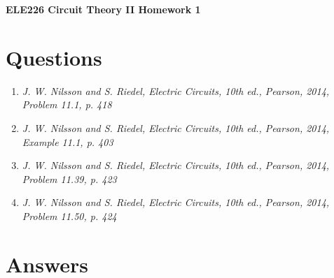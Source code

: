 \documentclass[11pt]{article}
\begin{document}
\begin{center}
\large
\textbf{ELE226 Circuit Theory II Homework 1}
\end{center}

\section{Questions}

\begin{enumerate}[leftmargin=*,label=\textbf{\arabic*.}]

\item \textit{J. W. Nilsson and S. Riedel, Electric Circuits, 10th ed., Pearson, 2014, Problem 11.1, p. 418}
\item \textit{J. W. Nilsson and S. Riedel, Electric Circuits, 10th ed., Pearson, 2014, Example 11.1, p. 403}
\item \textit{J. W. Nilsson and S. Riedel, Electric Circuits, 10th ed., Pearson, 2014, Problem 11.39, p. 423}
\item \textit{J. W. Nilsson and S. Riedel, Electric Circuits, 10th ed., Pearson, 2014, Problem 11.50, p. 424}

\end{enumerate}

\section{Answers}
\end{document}
